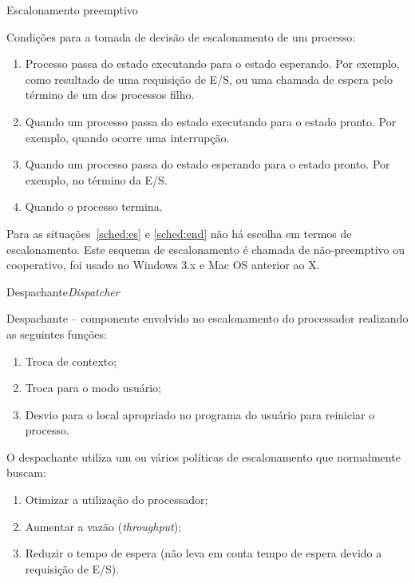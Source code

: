 \begin{frame}{Escalonamento preemptivo}

  Condições para a tomada de decisão de escalonamento de um processo:

  \begin{enumerate}
  \item<1-| alert@2> \label{sched:es} Processo passa do estado \alert{executando}
    para o estado \alert{esperando}. Por exemplo, como resultado de
    uma requisição de E/S, ou uma chamada de espera pelo término de um
    dos processos filho.
    \item \label{sched:irq}Quando um processo passa do
    estado \alert<1>{executando} para o estado \alert<1>{pronto}. Por
    exemplo, quando ocorre uma interrupção.
     \item \label{sched:endes} Quando um processo passa
    do estado \alert<1>{esperando} para o estado \alert<1>{pronto}. Por
    exemplo, no término da E/S.
    \item<1-| alert@2> \label{sched:end} Quando o processo \alert<1>{termina}.
  \end{enumerate}

{\small Para as situações~\ref{sched:es} e \ref{sched:end} não há
  escolha em termos de escalonamento. Este esquema de escalonamento é
  chamada de \alert{não-preemptivo} ou \alert{cooperativo}, foi usado
  no Windows 3.x e Mac OS anterior ao X.}

\end{frame}

\begin{frame}{Despachante}{\em Dispatcher}

{ 
Despachante -- componente envolvido no escalonamento do processador
realizando as seguintes funções:
\begin{enumerate}
 \item Troca de contexto;
\item Troca para o modo usuário;
\item Desvio para o local apropriado no programa do usuário para
  reiniciar o processo.
\end{enumerate}
}

O despachante utiliza um ou vários \alert{políticas de escalonamento}
que normalmente buscam:

\begin{enumerate}
\item Otimizar a utilização do processador;
\item Aumentar a vazão ({\em throughput});
\item Reduzir o tempo de espera (não leva em conta tempo de espera
  devido a requisição de E/S).
\end{enumerate}

  
\end{frame}

